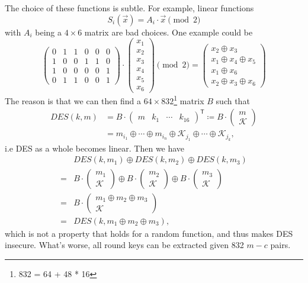 The choice of these functions is subtle. For example, linear functions 
\[S_i(\vec{x})=A_i\cdot\vec{x}\pmod 2\]
with $A_i$ being a $4\times 6$ matrix are bad choices. One example could be 
\[\begin{pmatrix}
0 & 1 & 1 & 0 & 0 & 0 \\
1 & 0 & 0 & 1 & 1 & 0 \\
1 & 0 & 0 & 0 & 0 & 1 \\
0 & 1 & 1 & 0 & 0 & 1
\end{pmatrix}\cdot\begin{pmatrix}
x_1\\
x_2\\
x_3\\
x_4\\
x_5\\
x_6
\end{pmatrix} \pmod 2=\begin{pmatrix}
x_2\oplus x_3\\
x_1\oplus x_4 \oplus x_5\\
x_1\oplus x_6\\
x_2\oplus x_3\oplus x_6
\end{pmatrix}\]
The reason is that we can then find a $64\times 832$\footnote{832 = 64 + 48 * 16} matrix $B$ such that 
\begin{align*}
DES(k,m)&=B\cdot\begin{pmatrix}m&k_1&\cdots&k_{16}\end{pmatrix}^{\mathsf{T}}\coloneqq B\cdot\begin{pmatrix}m\\\mathcal{K}\end{pmatrix}\\
&=m_{i_1}\oplus\cdots\oplus m_{i_n}\oplus \mathcal{K}_{j_1}\oplus\cdots\oplus \mathcal{K}_{j_k},
\end{align*}
i.e DES as a whole becomes linear. Then we have 
\begin{align*}
 &DES(k,m_1)\oplus DES(k,m_2)\oplus DES(k,m_3)\\
=&B\cdot\begin{pmatrix}m_1\\\mathcal{K}\end{pmatrix}\oplus B\cdot\begin{pmatrix}m_2\\\mathcal{K}\end{pmatrix}\oplus  B\cdot\begin{pmatrix}m_3\\\mathcal{K}\end{pmatrix}\\
=&B\cdot\begin{pmatrix}m_1\oplus m_2\oplus m_3\\\mathcal{K}\end{pmatrix}\\
=&DES(k,m_1\oplus m_2\oplus m_3),
\end{align*}
which is not a property that holds for a random function, and thus makes DES insecure. What's worse, all round keys can be extracted given 832 $m-c$ pairs.

